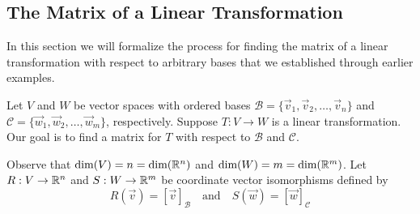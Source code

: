 \documentclass{ximera}
\begin{document}





\subsection*{The Matrix of a Linear Transformation}
In this section we will formalize the process for finding the matrix of a linear transformation with respect to arbitrary bases that we established through earlier examples.

Let $V$ and $W$ be vector spaces with ordered bases $\mathcal{B}=\{\vec{v}_1, \vec{v}_2,\ldots ,\vec{v}_n\}$ and $\mathcal{C}=\{\vec{w}_1, \vec{w}_2,\ldots ,\vec{w}_m\}$, respectively.   Suppose $T:V\rightarrow W$ is a linear transformation.  Our goal is to find a matrix for $T$ with respect to $\mathcal{B}$ and $\mathcal{C}$.

Observe that $\text{dim}(V)=n=\text{dim}(\mathbb{R}^n)$ and $\text{dim}(W)=m=\text{dim}(\mathbb{R}^m)$. Let $R:V\rightarrow \mathbb{R}^n$ and $S:W\rightarrow \mathbb{R}^m$ be coordinate vector isomorphisms defined by
$$R(\vec{v})=[\vec{v}]_{\mathcal{B}}\quad\text{and}\quad S(\vec{w})=[\vec{w}]_{\mathcal{C}}$$
\end{document}
